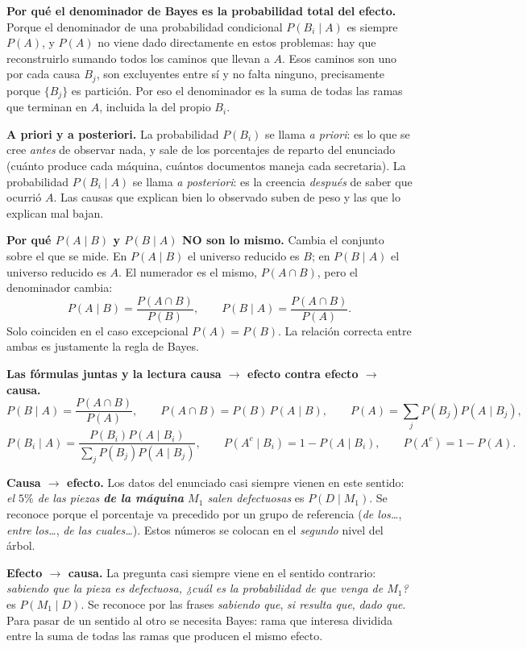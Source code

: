 \documentclass[11pt]{article}
\begin{document}
\begin{teo}
\medskip
\textbf{Por qué el denominador de Bayes es la probabilidad total del efecto.} Porque el denominador de una probabilidad condicional $P(B_i\mid A)$ es siempre $P(A)$, y $P(A)$ no viene dado directamente en estos problemas: hay que reconstruirlo sumando todos los caminos que llevan a $A$. Esos caminos son uno por cada causa $B_j$, son excluyentes entre sí y no falta ninguno, precisamente porque $\{B_j\}$ es partición. Por eso el denominador es la suma de todas las ramas que terminan en $A$, incluida la del propio $B_i$.

\medskip
\textbf{A priori y a posteriori.} La probabilidad $P(B_i)$ se llama \emph{a priori}: es lo que se cree \emph{antes} de observar nada, y sale de los porcentajes de reparto del enunciado (cuánto produce cada máquina, cuántos documentos maneja cada secretaria). La probabilidad $P(B_i\mid A)$ se llama \emph{a posteriori}: es la creencia \emph{después} de saber que ocurrió $A$. Las causas que explican bien lo observado suben de peso y las que lo explican mal bajan.

\medskip
\textbf{Por qué $P(A\mid B)$ y $P(B\mid A)$ NO son lo mismo.} Cambia el conjunto sobre el que se mide. En $P(A\mid B)$ el universo reducido es $B$; en $P(B\mid A)$ el universo reducido es $A$. El numerador es el mismo, $P(A\cap B)$, pero el denominador cambia:
\[
P(A\mid B)=\frac{P(A\cap B)}{P(B)},\qquad P(B\mid A)=\frac{P(A\cap B)}{P(A)} .
\]
Solo coinciden en el caso excepcional $P(A)=P(B)$. La relación correcta entre ambas es justamente la regla de Bayes.
\end{teo}

\begin{tip}
\textbf{Las fórmulas juntas y la lectura causa $\to$ efecto contra efecto $\to$ causa.}
\[
P(B\mid A)=\frac{P(A\cap B)}{P(A)},\qquad
P(A\cap B)=P(B)\,P(A\mid B),\qquad
P(A)=\sum_{j}P(B_j)P(A\mid B_j),
\]
\[
P(B_i\mid A)=\frac{P(B_i)P(A\mid B_i)}{\displaystyle\sum_{j}P(B_j)P(A\mid B_j)},\qquad
P(A^{c}\mid B_i)=1-P(A\mid B_i),\qquad P(A^{c})=1-P(A).
\]

\medskip
\textbf{Causa $\to$ efecto.} Los datos del enunciado casi siempre vienen en este sentido: \emph{el $5\%$ de las piezas \textbf{de la máquina} $M_1$ salen defectuosas} es $P(D\mid M_1)$. Se reconoce porque el porcentaje va precedido por un grupo de referencia (\emph{de los\dots}, \emph{entre los\dots}, \emph{de las cuales\dots}). Estos números se colocan en el \emph{segundo} nivel del árbol.

\medskip
\textbf{Efecto $\to$ causa.} La pregunta casi siempre viene en el sentido contrario: \emph{sabiendo que la pieza es defectuosa, ¿cuál es la probabilidad de que venga de $M_1$?} es $P(M_1\mid D)$. Se reconoce por las frases \emph{sabiendo que}, \emph{si resulta que}, \emph{dado que}. Para pasar de un sentido al otro se necesita Bayes: rama que interesa dividida entre la suma de todas las ramas que producen el mismo efecto.
\end{tip}
\end{document}
